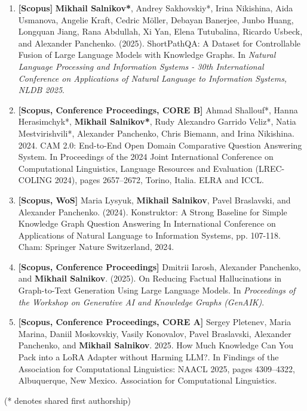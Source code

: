 \begin{enumerate}
    \item \textbf{[Scopus]} \textbf{Mikhail Salnikov*}, Andrey Sakhovskiy*, Irina Nikishina, Aida Usmanova, Angelie Kraft, Cedric Möller, Debayan Banerjee, Junbo Huang, Longquan Jiang, Rana Abdullah, Xi Yan, Elena Tutubalina, Ricardo Usbeck, and Alexander Panchenko. (2025). ShortPathQA: A Dataset for Controllable Fusion of Large Language Models with Knowledge Graphs. In \textit{Natural Language Processing and Information Systems - 30th International Conference on Applications of Natural Language to Information Systems, NLDB 2025}.
    \item \textbf{[Scopus, Conference Proceedings, CORE B]} Ahmad Shallouf*, Hanna Herasimchyk*, \textbf{Mikhail Salnikov*}, Rudy Alexandro Garrido Veliz*, Natia Mestvirishvili*, Alexander Panchenko, Chris Biemann, and Irina Nikishina. 2024. CAM 2.0: End-to-End Open Domain Comparative Question Answering System. In Proceedings of the 2024 Joint International Conference on Computational Linguistics, Language Resources and Evaluation (LREC-COLING 2024), pages 2657–2672, Torino, Italia. ELRA and ICCL.
    \item \textbf{[Scopus, WoS]} Maria Lysyuk, \textbf{Mikhail Salnikov}, Pavel Braslavski, and Alexander Panchenko. (2024). Konstruktor: A Strong Baseline for Simple Knowledge Graph Question Answering In International Conference on Applications of Natural Language to Information Systems, pp. 107-118. Cham: Springer Nature Switzerland, 2024.
    \item \textbf{[Scopus, Conference Proceedings]} Dmitrii Iarosh, Alexander Panchenko, and \textbf{Mikhail Salnikov}. (2025). On Reducing Factual Hallucinations in Graph-to-Text Generation Using Large Language Models. In \textit{Proceedings of the Workshop on Generative AI and Knowledge Graphs (GenAIK)}.
    \item \textbf{[Scopus, Conference Proceedings, CORE A]} Sergey Pletenev, Maria Marina, Daniil Moskovskiy, Vasily Konovalov, Pavel Braslavski, Alexander Panchenko, and \textbf{Mikhail Salnikov}. 2025. How Much Knowledge Can You Pack into a LoRA Adapter without Harming LLM?. In Findings of the Association for Computational Linguistics: NAACL 2025, pages 4309–4322, Albuquerque, New Mexico. Association for Computational Linguistics.
\end{enumerate}
(* denotes shared first authorship)

